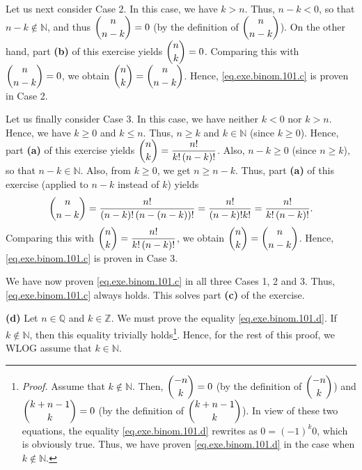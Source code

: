 \documentclass[paper=a4, fontsize=12pt]{scrartcl} %
\newcommand{\QQ}{\mathbb{Q}} %
\newcommand{\NN}{\mathbb{N}} %
\newcommand{\ZZ}{\mathbb{Z}} %
\newcommand{\tup}[1]{\left( #1 \right)}
\theoremstyle{plainsl}
\theoremstyle{definition}
\theoremstyle{remark}
\begin{document}
Let us next consider Case 2.
In this case, we have $k > n$.
Thus, $n-k < 0$, so that $n-k \notin \NN$, and thus
$\dbinom{n}{n-k} = 0$
(by the definition of $\dbinom{n}{n-k}$).
On the other hand, part \textbf{(b)} of this exercise
yields $\dbinom{n}{k} = 0$.
Comparing this with $\dbinom{n}{n-k} = 0$, we obtain
$\dbinom{n}{k} = \dbinom{n}{n-k}$.
Hence, \eqref{eq.exe.binom.101.c} is proven in Case 2.

Let us finally consider Case 3.
In this case, we have neither $k < 0$ nor $k > n$.
Hence, we have $k \geq 0$ and $k \leq n$.
Thus, $n \geq k$ and $k \in \NN$ (since $k \geq 0$).
Hence, part \textbf{(a)} of this exercise
yields $\dbinom{n}{k} = \dfrac{n!}{k! \tup{n-k}!}$.
Also, $n-k \geq 0$ (since $n \geq k$), so that
$n-k \in \NN$. Also, from $k \geq 0$, we get $n \geq n-k$.
Thus, part \textbf{(a)} of this exercise (applied to $n-k$
instead of $k$) yields
\[
\dbinom{n}{n-k} = \dfrac{n!}{\tup{n-k}! \tup{n-\tup{n-k}}!}
= \dfrac{n!}{\tup{n-k}! k!} = \dfrac{n!}{k! \tup{n-k}!} .
\]
Comparing this with $\dbinom{n}{k} = \dfrac{n!}{k! \tup{n-k}!}$,
we obtain $\dbinom{n}{k} = \dbinom{n}{n-k}$.
Hence, \eqref{eq.exe.binom.101.c} is proven in Case 3.

We have now proven \eqref{eq.exe.binom.101.c} in all three
Cases 1, 2 and 3. Thus, \eqref{eq.exe.binom.101.c} always holds.
This solves part \textbf{(c)} of the exercise.

\vspace{0.8pc}

\textbf{(d)}
Let $n \in \QQ$ and $k \in \ZZ$.
We must prove the equality \eqref{eq.exe.binom.101.d}.
If $k \notin \NN$, then this equality trivially
holds\footnote{\textit{Proof.} Assume that $k \notin \NN$.
Then, $\dbinom{-n}{k} = 0$ (by the definition of
$\dbinom{-n}{k}$) and $\dbinom{k + n - 1}{k} = 0$
(by the definition of $\dbinom{k + n - 1}{k}$). In view of
these two equations, the equality
\eqref{eq.exe.binom.101.d} rewrites as $0 = \tup{-1}^k 0$,
which is obviously true.
Thus, we have proven \eqref{eq.exe.binom.101.d} in the case
when $k \notin \NN$.}.
Hence, for the rest of this proof, we WLOG assume that
$k \in \NN$.
\end{document}
